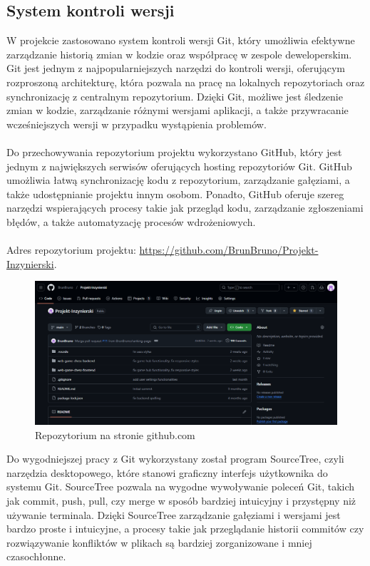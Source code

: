 \documentclass[12pt,a4paper]{article}
\begin{document}
\subsection{System kontroli wersji}

\noindent
W projekcie zastosowano system kontroli wersji Git, który umożliwia efektywne zarządzanie historią zmian w kodzie oraz współpracę w zespole deweloperskim. Git jest jednym z najpopularniejszych narzędzi do kontroli wersji, oferującym rozproszoną architekturę, która pozwala na pracę na lokalnych repozytoriach oraz synchronizację z centralnym repozytorium. Dzięki Git, możliwe jest śledzenie zmian w kodzie, zarządzanie różnymi wersjami aplikacji, a także przywracanie wcześniejszych wersji w przypadku wystąpienia problemów.
\\\\
Do przechowywania repozytorium projektu wykorzystano  GitHub, który jest jednym z największych serwisów oferujących hosting repozytoriów Git. GitHub umożliwia łatwą synchronizację kodu z repozytorium, zarządzanie gałęziami, a także udostępnianie projektu innym osobom. Ponadto, GitHub oferuje szereg narzędzi wspierających procesy takie jak przegląd kodu, zarządzanie zgłoszeniami błędów, a także automatyzację procesów wdrożeniowych.
\\\\
Adres repozytorium projektu: \href{https://github.com/BrunBruno/Projekt-Inzynierski}{https://github.com/BrunBruno/Projekt-Inzynierski}.

\vspace{0.5cm}
\begin{figure}[h!]
    \centering
    \includegraphics[width=1\textwidth]{images/gh_repo.png}
    \caption{Repozytorium na stronie github.com}
\end{figure}
\vspace{0.5cm}

\noindent 
Do wygodniejszej pracy z Git wykorzystany został program  SourceTree, czyli narzędzia desktopowego, które stanowi graficzny interfejs użytkownika do systemu Git. SourceTree pozwala na wygodne wywoływanie poleceń Git, takich jak commit, push, pull, czy merge w sposób bardziej intuicyjny i przystępny niż używanie terminala. Dzięki SourceTree zarządzanie gałęziami i wersjami jest bardzo proste i intuicyjne, a procesy takie jak przeglądanie historii commitów czy rozwiązywanie konfliktów w plikach są bardziej zorganizowane i mniej czasochłonne.
\end{document}
